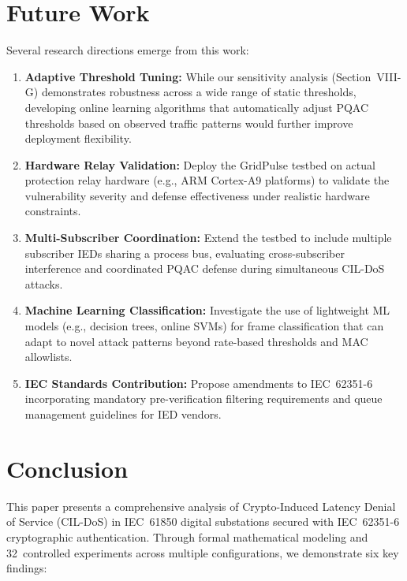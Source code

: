 \documentclass{ieeeaccess}
\begin{document}
\section{Future Work}

Several research directions emerge from this work:

\begin{enumerate}[leftmargin=*]
    \item \textbf{Adaptive Threshold Tuning:} While our sensitivity analysis (Section~VIII-G) demonstrates robustness across a wide range of static thresholds, developing online learning algorithms that automatically adjust PQAC thresholds based on observed traffic patterns would further improve deployment flexibility.
    \item \textbf{Hardware Relay Validation:} Deploy the GridPulse testbed on actual protection relay hardware (e.g., ARM Cortex-A9 platforms) to validate the vulnerability severity and defense effectiveness under realistic hardware constraints.
    \item \textbf{Multi-Subscriber Coordination:} Extend the testbed to include multiple subscriber IEDs sharing a process bus, evaluating cross-subscriber interference and coordinated PQAC defense during simultaneous CIL-DoS attacks.
    \item \textbf{Machine Learning Classification:} Investigate the use of lightweight ML models (e.g., decision trees, online SVMs) for frame classification that can adapt to novel attack patterns beyond rate-based thresholds and MAC allowlists.
    \item \textbf{IEC Standards Contribution:} Propose amendments to IEC~62351-6 incorporating mandatory pre-verification filtering requirements and queue management guidelines for IED vendors.
\end{enumerate}

\section{Conclusion}

This paper presents a comprehensive analysis of Crypto-Induced Latency Denial of Service (CIL-DoS) in IEC~61850 digital substations secured with IEC~62351-6 cryptographic authentication. Through formal mathematical modeling and 32~controlled experiments across multiple configurations, we demonstrate six key findings:
\end{document}
